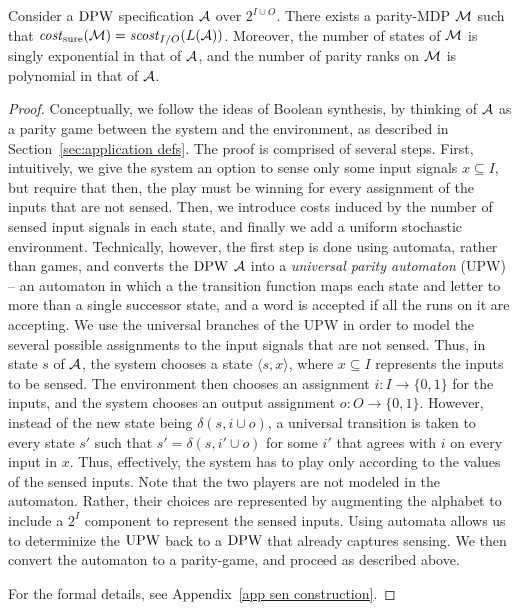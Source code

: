 \documentclass[runningheads,a4paper]{llncs}
\newcommand{\set}[1]{{\{#1\}}}
\newcommand{\zug}[1]{\langle #1  \rangle}
\newcommand{\DPW}{\mbox{\rm DPW}\xspace}
\newcommand{\UPW}{\mbox{\rm UPW}\xspace}
\newcommand{\A}{{\cal A}}
\newcommand{\M}{{\cal M}}
\newcommand{\scost}{{\it scost}}
\newcommand{\costs}{{\it cost}_{\rm sure}}
\begin{document}
\vspace*{-5pt}
\begin{theorem}
\label{thm:sensing to parity-MDP}
Consider a $\DPW$ specification $\A$ over $2^{I\cup O}$. There exists a parity-MDP $\M$ such that $\costs(\M)=\scost_{I/O}(L(\A))$.	
Moreover, the number of states of $\M$ is singly exponential in that of $\A$, and the number of parity ranks on $\M$ is polynomial in that of $\A$.
\end{theorem}
\vspace*{-10pt}
\begin{proof}
Conceptually, we follow the ideas of Boolean synthesis, by thinking of $\A$ as a parity game between the system and the environment, as described in Section~\ref{sec:application defs}. The proof is comprised of several steps. First, intuitively, we give the system an option to sense only some input signals $x\subseteq I$, but require that then, the play must be winning for every assignment of the inputs that are not sensed. Then, we introduce costs induced by the number of sensed input signals in each state, and finally we add a uniform stochastic environment. 
Technically, however, the first step is done using automata, rather than games, and converts the $\DPW$ $\A$ into a {\em universal parity automaton\/} (UPW) -- an automaton in which a the transition function maps each state and letter to more than a single successor state, and a word is accepted if all the runs on it are accepting. We use the universal branches of the UPW in order to model the several possible assignments to the input signals that are not sensed. Thus, in state $s$ of $\A$, the system chooses a state $\zug{s,x}$, where $x\subseteq I$ represents the inputs to be sensed. The environment then chooses an assignment $i:I\to \set{0,1}$ for the inputs, and the system chooses an output assignment $o:O\to \set{0,1}$. However, instead of the new state being $\delta(s,i\cup o)$, a universal transition is taken to every state $s'$ such that $s'=\delta(s,i'\cup o)$ for some  $i'$ that agrees with $i$ on every input in $x$. Thus, effectively, the system has to play only according to the values of the sensed inputs. Note that the two players are not modeled in the automaton. Rather, their choices are represented by augmenting the alphabet to include a $2^I$ component to represent the sensed inputs.
Using automata allows us to determinize the $\UPW$ back to a $\DPW$ that already captures sensing. We then convert the automaton to a parity-game, and proceed as described above.

For the formal details, see Appendix~\ref{app sen construction}.
\end{proof}
\end{document}
